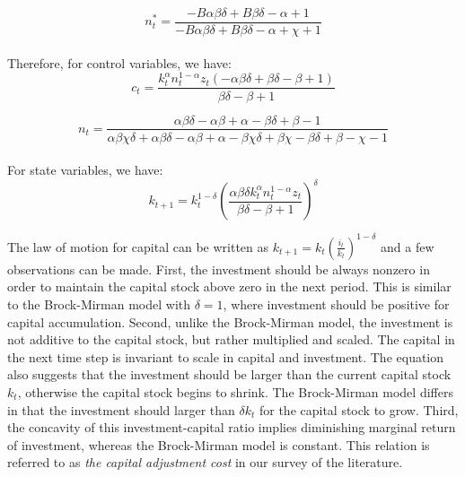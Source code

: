 \documentclass{article}
\begin{document}
\begin{equation}
    n_t^* = \frac{-B\alpha\beta\delta + B\beta\delta - \alpha + 1}{-B\alpha\beta\delta + B\beta\delta - \alpha + \chi + 1}
\end{equation}\\

Therefore, for control variables, we have:\\
\begin{equation}
    c_t = \frac{k_t^\alpha n_t^{1-\alpha} z_t (-\alpha\beta\delta + \beta\delta - \beta + 1)}{\beta\delta - \beta + 1}
\end{equation}

\begin{equation}
    n_t = \frac{\alpha\beta\delta - \alpha\beta + \alpha - \beta\delta + \beta - 1}{\alpha\beta\chi\delta + \alpha\beta\delta - \alpha\beta + \alpha - \beta\chi\delta + \beta\chi - \beta\delta + \beta - \chi - 1}
\end{equation}\\

For state variables, we have:\\
\begin{equation}
    k_{t+1} = k_t^{1-\delta} \left(\frac{\alpha\beta\delta k_t^\alpha n_t^{1-\alpha} z_t}{\beta\delta - \beta + 1}\right)^\delta
\end{equation}


\hspace{1em} The law of motion for capital can be written as \(k_{t+1} = k_t(\frac{i_t}{k_t})^{1-\delta}\) and a few observations can be made.
First, the investment should be always nonzero in order to maintain the capital stock above zero in the next period.
This is similar to the Brock-Mirman model with \(\delta = 1\), where investment should be positive for capital accumulation.
Second, unlike the Brock-Mirman model, the investment is not additive to the capital stock, but rather multiplied and scaled.
The capital in the next time step is invariant to scale in capital and investment.
The equation also suggests that the investment should be larger than the current capital stock \(k_t\), otherwise the capital stock begins to shrink.
The Brock-Mirman model differs in that the investment should larger than \(\delta k_t\) for the capital stock to grow.
Third, the concavity of this investment-capital ratio implies diminishing marginal return of investment,
whereas the Brock-Mirman model is constant.
This relation is referred to as \textit{the capital adjustment cost} in our survey of the literature.\\
\end{document}
